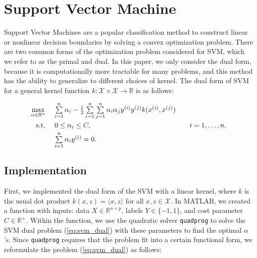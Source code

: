 
\section{Support Vector Machine}\label{sec:svm}

Support Vector Machines are a popular classification method to construct linear or nonlinear decision boundaries
by solving a convex optimization problem.  There are two common forms of the optimization problem considered for SVM,
which we refer to as the primal and dual.  In this paper, we only consider the dual form, because it is computationally more tractable
for many problems, and this method has the ability to generalize to different choices of kernel.  The dual form of SVM for a general
kernel function $k: \mathcal{X} \times \mathcal{X} \rightarrow \mathbb{R}$ is as follows:

\begin{equation}
\label{eq:svm_dual}
\begin{array}{rll}
\underset{\alpha \in \mathbb{R}^n}{\max}~ & \sum\limits_{i = 1}^n \alpha_i 
- \frac{1}{2} \sum\limits_{i = 1}^n\sum\limits_{j = 1}^n \alpha_i \alpha_j y^{(i)} y^{(j)} k(x^{(i)}, x^{(j)}) \vspace{3pt}\\
\textup{s.t.}~ & 0 \leq \alpha_i \leq C,&~~~i=1,\ldots ,n, \vspace{3pt}\\
& \sum\limits_{i = 1}^n \alpha_i y^{(i)} = 0. & \\
\end{array}
\end{equation}

\subsection{Implementation}

First, we implemented the dual form of the SVM with a linear kernel, where $k$ is the usual dot product $k(x, z) = \langle x,z \rangle$ for all $x, z \in \mathcal{X}$. 
In MATLAB, we created a function with inputs: data $X \in \mathbb{R}^{n \times p}$, labels $Y \in \{-1,1\}$, and cost parameter $C \in \mathbb{R}^{+}$. 
Within the function, we use the quadratic solver \texttt{quadprog} to solve the SVM dual problem (\ref{eq:svm_dual}) with these parameters to find the optimal $\alpha$'s.
Since \texttt{quadprog} requires that the problem fit into a certain functional form, we reformulate the problem (\ref{eq:svm_dual}) as follows:

